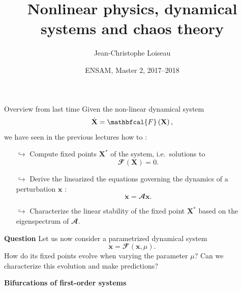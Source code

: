 \documentclass[usenames,dvipsnames,svgnames,10pt,aspectratio=169]{beamer}
\title[Nonlinear Physics] %
{
	Nonlinear physics, dynamical \\ systems and chaos theory
}
\author[J.-Ch.~Loiseau] %
{
	Jean-Christophe Loiseau
}
\institute[unused]
{
	\url{jean-christophe.loiseau@ensam.eu} \\
	DynFluid, \\
	Arts et M\'etiers ParisTech, France
}
\date[unused]{ENSAM, Master 2, 2017--2018}
\begin{document}
\titleframe %


\begin{frame}[t, c]{Overview from last time}{}
	Given the non-linear dynamical system
	\begin{equation}
		\dot{\mathbf{X}} = \mathbfcal{F}\left( \mathbf{X} \right),
		\notag
	\end{equation}
	we have seen in the previous lectures how to :
	\begin{itemize}
		\item[$\hookrightarrow$] Compute fixed points $\mathbf{X}^*$ of the system, i.e.\ solutions to
		$$\mathbfcal{F}\left( \mathbf{X} \right) = 0.$$

		\item[$\hookrightarrow$] Derive the linearized the equations governing the dynamics of a perturbation $\mathbf{x}$ :
		$$\dot{\mathbf{x}} = \mathbfcal{A} \mathbf{x}.$$

		\item[$\hookrightarrow$] Characterize the linear stability of the fixed point $\mathbf{X}^*$ based on the eigenspectrum of $\mathbfcal{A}$.
	\end{itemize}

	\vspace{1cm}
\end{frame}

\begin{frame}[t, c]{}{}
	\begin{block}{\centering \textbf{Question}}
		Let us now consider a parametrized dynamical system
		$$\dot{\mathbf{x}} = \mathbfcal{F}\left( \mathbf{x}, \mu \right).$$
		How do its fixed points evolve when varying the parameter $\mu$? Can we characterize this evolution and make predictions?
	\end{block}
\end{frame}

\begin{frame}[t, c]{}
	\centering
	\vspace{1cm}

	{\Large \textbf{Bifurcations of first-order systems}}

	\bigskip

	{}

\end{frame}
\end{document}
